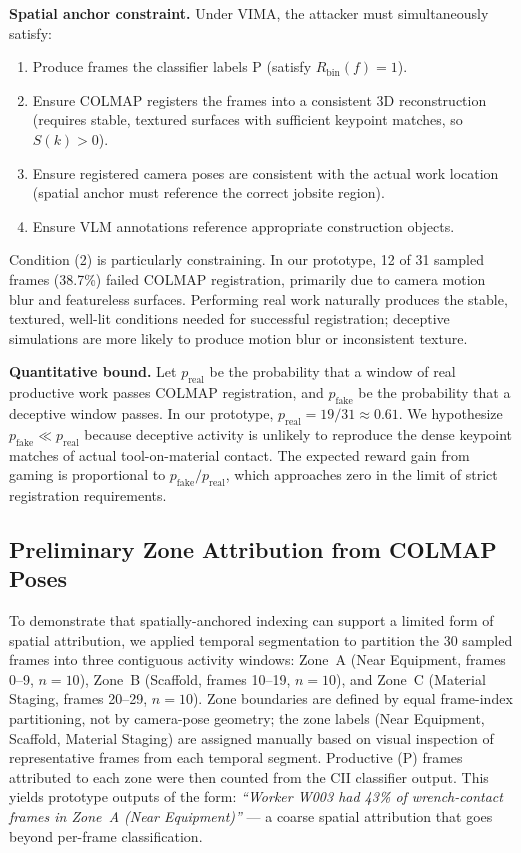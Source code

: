 \documentclass[sigconf,nonacm]{acmart}
\begin{document}
\textbf{Spatial anchor constraint.} Under VIMA, the attacker must
simultaneously satisfy:
\begin{enumerate}[leftmargin=1.4em,itemsep=0.1em]
\item Produce frames the classifier labels P (satisfy $R_{\text{bin}}(f) = 1$).
\item Ensure COLMAP registers the frames into a consistent 3D reconstruction
  (requires stable, textured surfaces with sufficient keypoint matches, so
  $S(k) > 0$).
\item Ensure registered camera poses are consistent with the actual work location
  (spatial anchor must reference the correct jobsite region).
\item Ensure VLM annotations reference appropriate construction objects.
\end{enumerate}

Condition (2) is particularly constraining. In our prototype, 12 of 31 sampled
frames (38.7\%) failed COLMAP registration, primarily due to camera motion blur
and featureless surfaces. Performing real work naturally produces the stable,
textured, well-lit conditions needed for successful registration; deceptive
simulations are more likely to produce motion blur or inconsistent texture.

\textbf{Quantitative bound.} Let $p_{\text{real}}$ be the probability that a
window of real productive work passes COLMAP registration, and $p_{\text{fake}}$
be the probability that a deceptive window passes. In our prototype,
$p_{\text{real}} = 19/31 \approx 0.61$. We hypothesize $p_{\text{fake}} \ll
p_{\text{real}}$ because deceptive activity is unlikely to reproduce the dense
keypoint matches of actual tool-on-material contact. The expected reward gain
from gaming is proportional to $p_{\text{fake}} / p_{\text{real}}$, which
approaches zero in the limit of strict registration requirements.

\subsection{Preliminary Zone Attribution from COLMAP Poses}
\label{sec:zone-attr}

To demonstrate that spatially-anchored indexing can support a limited form of
spatial attribution, we applied temporal segmentation to partition the 30
sampled frames into three contiguous activity windows: Zone~A (Near Equipment,
frames 0--9, $n=10$), Zone~B (Scaffold, frames 10--19, $n=10$), and
Zone~C (Material Staging, frames 20--29, $n=10$). Zone boundaries are defined
by equal frame-index partitioning, not by camera-pose geometry; the zone labels
(Near Equipment, Scaffold, Material Staging) are assigned manually based on
visual inspection of representative frames from each temporal segment. Productive
(P) frames attributed to each zone were then counted from the CII classifier
output. This yields prototype outputs of the form: \emph{``Worker W003 had 43\%
of wrench-contact frames in Zone~A (Near Equipment)''} --- a coarse spatial
attribution that goes beyond per-frame classification.
\end{document}
